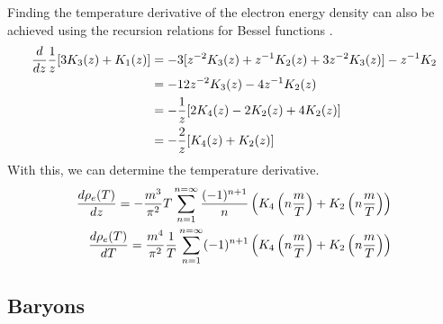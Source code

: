 Finding the temperature derivative of the electron energy density can also be achieved using the recursion relations for Bessel functions \cite[\href{https://dlmf.nist.gov/10.29.E2}{(10.29.2)}]{NIST:DLMF}.
\begin{align}
    \frac{d}{dz} \frac{1}{z}[3K_{3}(z)+K_{1}(z)]&=-3[z^{-2} K_{3}(z)+z^{-1} K_{2}(z)+ 3z^{-2} K_{3}(z)]-z^{-1} K_{2}\\
    &=-12 z^{-2} K_{3}(z)-4z^{-1} K_{2}(z)\\
    &=-\frac{1}{z}[2K_{4}(z)-2K_{2}(z)+4 K_{2}(z)]\\
    &=-\frac{2}{z}[K_{4}(z)+K_{2}(z)]
\end{align}
With this, we can determine the temperature derivative.
\begin{align}
    \frac{d\rho_e(T)}{dz}=-\frac{m^3}{\pi^2} T \sum_{n=1}^{n=\infty} \frac{(-1)^{n+1}}{n}  \left(K_4\left(n\frac{m }{T}\right) + K_2\left(n\frac{m }{T}\right) \right)\\
    \frac{d\rho_e(T)}{dT}=\frac{m^4}{\pi^2} \frac{1}{T} \sum_{n=1}^{n=\infty} (-1)^{n+1}   \left(K_4\left(n\frac{m }{T}\right) + K_2\left(n\frac{m }{T}\right) \right)
\end{align}


\subsection{Baryons}





